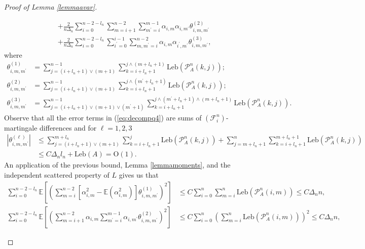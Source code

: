 \documentclass{article}
\theoremstyle{plain}
\theoremstyle{definition}
\theoremstyle{remark}
\newcommand{\Leb}{\ensuremath{\mathrm{Leb}}}
\begin{document}
\begin{appendix}
\begin{proof}[Proof of Lemma \ref{lemmaavar}]
\begin{description}
\begin{equation}
\begin{aligned}
				& +\frac{2}{n\Delta_{n}}\sum_{i=0}^{n-2-l_{n}}\sum_{m=i+1}^{n-2}\sum_{m^{\prime}=i}^{m-1}\alpha_{i,m}\alpha_{i,m^{\prime}}\theta_{i,m,m^{\prime}}^{(2)}\\
				& +\frac{2}{n\Delta_{n}}\sum_{i=0}^{n-2-l_{n}}\sum_{i^{\prime}=0}^{i-1}\sum_{m,m^{\prime}=i}^{n-2}\alpha_{i,m}\alpha_{i^{\prime},m^{\prime}}\theta_{i,m,m^{\prime}}^{(3)},
			\end{aligned}
			\label{eq:decompq4}
		\end{equation}
		where 
		\begin{equation}
			\begin{aligned}\theta_{i,m,m^{\prime}}^{(1)} & =\sum_{j=(i+l_{n}+1)\lor(m+1)}^{n-1}\sum_{k=i+l_{n}+1}^{j\land(m+l_{n}+1)}\Leb(\mathcal{P}_{A}^{n}(k,j));\\
				\theta_{i,m,m^{\prime}}^{(2)} & =\sum_{j=(i+l_{n}+1)\lor(m+1)}^{n-1}\sum_{k=i+l_{n}+1}^{j\land(m^{\prime}+l_{n}+1)}\Leb(\mathcal{P}_{A}^{n}(k,j));\\
				\theta_{i,m,m^{\prime}}^{(3)} & =\sum_{j=(i+l_{n}+1)\lor(m+1)\lor(m^{\prime}+1)}^{n-1}\sum_{k=i+l_{n}+1}^{j\land(m^{\prime}+l_{n}+1)\land(m+l_{n}+1)}\Leb(\mathcal{P}_{A}^{n}(k,j)).
			\end{aligned}
			\label{eq:that123def}
		\end{equation}
		Observe that all the error terms in (\ref{eq:decompq4}) are sums
		of $(\mathscr{F}_{i}^{n})$-martingale differences and for $\ell=1,2,3$
		\begin{align*}
			\left|\theta_{i,m,m^{\prime}}^{(\ell)}\right| & \leq\sum_{j=(i+l_{n}+1)\lor(m+1)}^{m+l_{n}}\sum_{k=i+l_{n}+1}^{j}\Leb(\mathcal{P}_{A}^{n}(k,j))+\sum_{j=m+l_{n}+1}^{n}\sum_{k=i+l_{n}+1}^{m+l_{n}+1}\Leb(\mathcal{P}_{A}^{n}(k,j))\\
			& \leq C\Delta_{n}l_{n}+\Leb(A)=\mathrm{O}(1).
		\end{align*}
		An application of the previous bound, Lemma \ref{lemmamoments}, 
		and the independent scattered property of $L$ gives us that 
		\begin{align*}
			\sum_{i=0}^{n-2-l_{n}}\mathbb{E}\left[\left(\sum_{m=i}^{n-2}[\alpha_{i,m}^{2}-\mathbb{E}(\alpha_{i,m}^{2})]\theta_{i,m,m^{\prime}}^{(1)}\right)^{2}\right] & \leq C\sum_{i=0}^{n}\sum_{m=i}^{n}\Leb(\mathcal{P}_{A}^{n}(i,m))\leq C\Delta_{n}n,\\
			\sum_{i=0}^{n-2-l_{n}}\mathbb{E}\left[\left(\sum_{m=i+1}^{n-2}\alpha_{i,m}\sum_{m^{\prime}=i}^{m-1}\alpha_{i,m^{\prime}}\theta_{i,m,m^{\prime}}^{(2)}\right)^{2}\right] & \leq C\sum_{i=0}^{n}\left(\sum_{m=i}^{n}\Leb(\mathcal{P}_{A}^{n}(i,m))\right)^{2}\leq C\Delta_{n}n,

\end{align*}
\end{description}
\end{proof}
\end{appendix}
\end{document}
